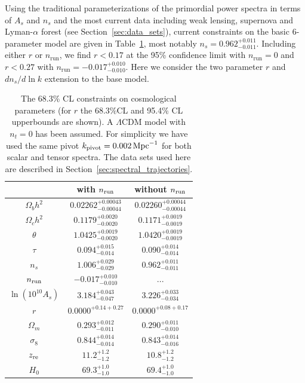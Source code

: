 \documentclass[a4paper,11pt]{article}
\def\nodata{...}
\begin{document}
Using the traditional parameterizations of the primordial power
spectra in terms of $A_s$ and $n_s$ and the most current data
including weak lensing, supernova and Lyman-$\alpha$ forest (see
Section~\ref{sec:data_sets}), current constraints on the
basic 6-parameter model are given in
Table~\ref{tab:marginalized_posteriors}, most notably
$n_s=0.962^{+0.011}_{-0.011}$. Including either $r$ or
$n_{\mathrm{run}}$, we find $r < 0.17 $ at the
95\% confidence limit with $n_{\mathrm{run}}=0$ and $r< 0.27$ with
$n_{\mathrm{run}} = -0.017^{+0.010}_{-0.010}$. Here we consider the
two parameter $r$ and $dn_s / d\ln k$ extension to the base model.
\begin{table}
  \begin{center} %
  \caption{The 68.3\% CL constraints on cosmological parameters (for
  $r$ the 68.3\%CL and 95.4\% CL upperbounds are shown). A
  $\Lambda$CDM model with $n_t=0$ has been assumed. For simplicity we
  have used the same pivot $k_{\rm pivot}=0.002\,{\rm Mpc}^{-1}$ for
  both scalar and tensor spectra. The data sets used here are
  described in Section~\ref{sec:spectral_trajectories}.}
   \label{tab:marginalized_posteriors}
   \begin{tabular}{ccc}
   \hline
    & with $n_{\rm run}$ & without $n_{\rm run}$ \\
    \hline
     $ \Omega_b h^2 $ & $0.02262^{+0.00043}_{-0.00044}$ & $0.02260^{+0.00044}_{-0.00044}$ \\
     $ \Omega_c h^2 $ & $0.1179^{+0.0020}_{-0.0020}$ & $0.1171^{+0.0019}_{-0.0019}$ \\
     $ \theta $ & $1.0425^{+0.0019}_{-0.0020}$ & $1.0420^{+0.0019}_{-0.0019}$ \\
     $ \tau $ & $0.094^{+0.015}_{-0.014}$ & $0.090^{+0.014}_{-0.014}$ \\
     $ n_s $ & $1.006^{+0.029}_{-0.029}$ & $0.962^{+0.011}_{-0.011}$ \\
     $ n_{\rm run} $ & $-0.017^{+0.010}_{-0.010}$ & \nodata \\
     $ \ln(10^{10}A_s) $ & $3.184^{+0.043}_{-0.047}$ & $3.226^{+0.033}_{-0.034}$ \\
     $ r $ & $0.0000^{+0.14+0.27}$ & $0.0000^{+0.08+0.17}$ \\
     $ \Omega_m $ & $0.293^{+0.012}_{-0.011}$ & $0.290^{+0.011}_{-0.010}$ \\
     $ \sigma_8 $ & $0.844^{+0.014}_{-0.014}$ & $0.843^{+0.014}_{-0.016}$ \\
     $ z_{\rm re} $ & $11.2^{+1.2}_{-1.2}$ & $10.8^{+1.2}_{-1.2}$ \\
     $ H_0 $ & $69.3^{+1.0}_{-1.0}$ & $69.4^{+1.0}_{-1.0}$ \\
   \hline
   \end{tabular}
   \end{center}  %
\end{table}
\end{document}
